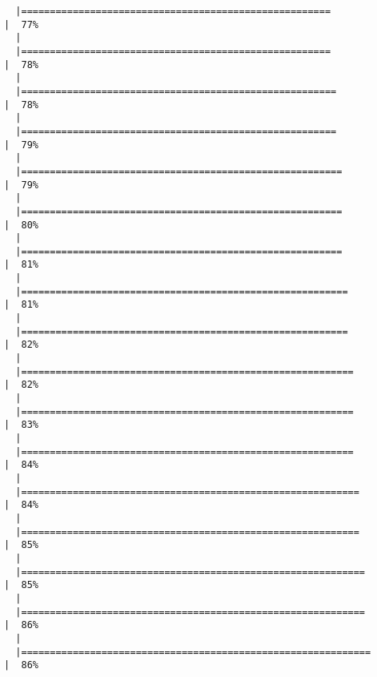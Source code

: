\documentclass[12pt]{article}
\begin{document}
\begin{verbatim}
  |======================================================                |  77%
  |                                                                            
  |======================================================                |  78%
  |                                                                            
  |=======================================================               |  78%
  |                                                                            
  |=======================================================               |  79%
  |                                                                            
  |========================================================              |  79%
  |                                                                            
  |========================================================              |  80%
  |                                                                            
  |========================================================              |  81%
  |                                                                            
  |=========================================================             |  81%
  |                                                                            
  |=========================================================             |  82%
  |                                                                            
  |==========================================================            |  82%
  |                                                                            
  |==========================================================            |  83%
  |                                                                            
  |==========================================================            |  84%
  |                                                                            
  |===========================================================           |  84%
  |                                                                            
  |===========================================================           |  85%
  |                                                                            
  |============================================================          |  85%
  |                                                                            
  |============================================================          |  86%
  |                                                                            
  |=============================================================         |  86%

\end{verbatim}
\end{document}
